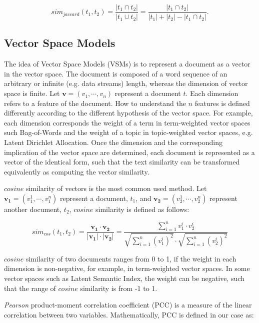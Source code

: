 \begin{equation}
    sim_{jaccard}(t_1, t_2) = \frac{|t_1 \cap t_2|}{|t_1 \cup t_2|} = \frac{|t_1 \cap t_2|}{|t_1| + |t_2| - |t_1 \cap t_2|}. 
\end{equation}


\subsection{Vector Space Models}
\label{sec:2.3}

The idea of Vector Space Models (VSMs) is to represent a document as a vector in the vector space. The document is composed of a word sequence of an arbitrary or infinite (e.g. data streams) length, whereas the dimension of vector space is finite. Let $\mathbf{v}=(v_1, \cdots, v_n)$ represent a document $t$. Each dimension refers to a feature of the document. How to understand the $n$ features is defined differently according to the different hypothesis of the vector space. For example, each dimension corresponds the weight of a term in term-weighted vector spaces such Bag-of-Words and the weight of a topic in topic-weighted vector spaces, e.g. Latent Dirichlet Allocation. Once the dimension and the corresponding implication of the vector space are determined, each document is represented as a vector of the identical form, such that the text similarity can be transformed equivalently as computing the vector similarity. 

$cosine$ similarity of vectors is the most common used method. Let $\mathbf{v_1}=(v_1^1, \cdots, v_1^n)$ represent a document, $t_1$, and $\mathbf{v_2}=(v_2^1, \cdots, v_2^n)$ represent another document, $t_2$, $cosine$ similarity is defined as follows:

\begin{equation}
    sim_{cos}(t_1, t_2) = \frac{\mathbf{v_1} \cdot \mathbf{v_2}}{|\mathbf{v_1}| \cdot |\mathbf{v_2}|} = \frac{\sum_{i=1}^n v_1^i \cdot v_2^i}{\sqrt{\sum_{i=1}^n (v_1^i)^2} \cdot \sqrt{\sum_{i=1}^n (v_2^i)^2}}
\end{equation}

$cosine$ similarity of two documents ranges from 0 to 1, if the weight in each dimension is non-negative, for example, in term-weighted vector spaces. In some vector spaces such as Latent Semantic Index, the weight can be negative, such that the range of $cosine$ similarity is from -1 to 1. 

\textit{Pearson} product-moment correlation coefficient (PCC) is a measure of the linear correlation between two variables. Mathematically, PCC is defined in our case as: 

